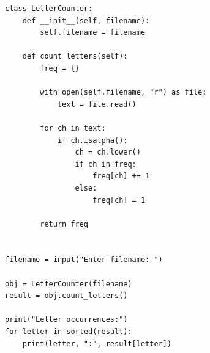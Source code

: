 \begin{verbatim}
class LetterCounter:
    def __init__(self, filename):
        self.filename = filename

    def count_letters(self):
        freq = {}

        with open(self.filename, "r") as file:
            text = file.read()

        for ch in text:
            if ch.isalpha():
                ch = ch.lower()
                if ch in freq:
                    freq[ch] += 1
                else:
                    freq[ch] = 1

        return freq


filename = input("Enter filename: ")

obj = LetterCounter(filename)
result = obj.count_letters()

print("Letter occurrences:")
for letter in sorted(result):
    print(letter, ":", result[letter])
\end{verbatim}